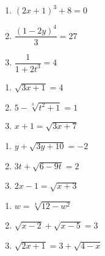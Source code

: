 \documentclass[11pt]{article}
\theoremstyle{definition}  %
\newcounter{HW}
\begin{document}
\begin{multicols}{3}
\begin{enumerate}
\setcounter{enumi}{\value{HW}}

\item  $(2x+1)^3 + 8 = 0$ \label{algineqexfirst} 
\item $\dfrac{(1-2y)^{4}}{3} = 27$ 
\item  $\dfrac{1}{1 + 2t^3} = 4$ 


\setcounter{HW}{\value{enumi}}
\end{enumerate}
\end{multicols}

\begin{multicols}{3}
\begin{enumerate}
\setcounter{enumi}{\value{HW}}

\item $\sqrt{3x+1} = 4$
\item $5 - \sqrt[3]{t^2+1} = 1$
\item $x+1 = \sqrt{3x+7}$ %

\setcounter{HW}{\value{enumi}}
\end{enumerate}
\end{multicols}


\begin{multicols}{3}
\begin{enumerate}
\setcounter{enumi}{\value{HW}}

\item  $y + \sqrt{3y+10} = -2$ %
\item  $3t+\sqrt{6-9t}=2$ %
\item $2x - 1 = \sqrt{x + 3}$ %

\setcounter{HW}{\value{enumi}}
\end{enumerate}
\end{multicols}

\begin{multicols}{3}
\begin{enumerate}
\setcounter{enumi}{\value{HW}}


\item $w = \sqrt[4]{12-w^2}$
\item $\sqrt{x - 2} + \sqrt{x - 5} = 3$ %
\item $\sqrt{2x+1} = 3 + \sqrt{4-x}$  \label{algineqexlast} %


\setcounter{HW}{\value{enumi}}
\end{enumerate}
\end{multicols}
\end{document}
